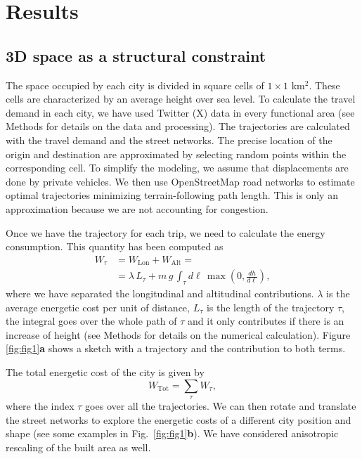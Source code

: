 \documentclass[twocolumn,amsmath,amssymb,floatfix,nature,shownopacs,footinbib,superscriptaddress]{revtex4-2}
\begin{document}
\section*{Results}

\subsection*{3D space as a structural constraint}

The space occupied by each city is divided in square cells of $1\times1$ km$^2$. These cells are characterized by an average height over sea level. To calculate the travel demand in each city, we have used Twitter (X) data in every functional area (see Methods for details on the data and processing). The trajectories are calculated with the travel demand and the street networks. The precise location of the origin and destination are approximated by selecting random points within the corresponding cell. To simplify the modeling, we assume that displacements are done by private vehicles. We then use OpenStreetMap road networks to estimate optimal trajectories minimizing terrain-following path length. This is only an approximation because we are not accounting for congestion.

Once we have the trajectory for each trip, we need to calculate the energy consumption. This quantity has been computed as
\begin{equation}\label{eq:tot_work}
    \begin{aligned}
    W_{\tau} & =  W_{\textrm{Lon}} + W_{\textrm{Alt}} =  \\
    & = \lambda \, L_\tau + m \, g \, \int_{\tau} d\ell \, \max\!\left(0, \frac{dh}{d\ell}\right)  ,
    \end{aligned}
\end{equation}
where we have separated the longitudinal and altitudinal contributions. $\lambda$ is the average energetic cost per unit of distance, $L_\tau$ is the length of the trajectory $\tau$, the integral goes over the whole path of $\tau$ and it only contributes if there is an increase of height (see Methods for details on the numerical calculation). Figure \ref{fig:fig1}{\bf a} shows a sketch with a trajectory and the contribution to both terms.

The total energetic cost of the city is given by
\begin{equation}
W_{\textrm{Tot}} = \sum_\tau W_{\tau} ,
\end{equation}
where the index $\tau$ goes over all the trajectories.
We can then rotate and translate the street networks to explore the energetic costs of a different city position and shape (see some examples in Fig.~\ref{fig:fig1}{\bf b}). We have considered anisotropic rescaling of the built area as well.
\end{document}
